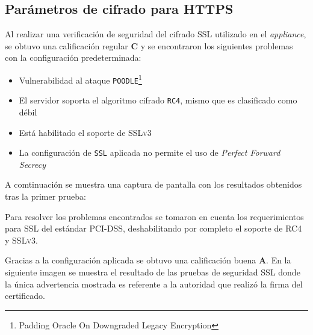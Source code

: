       \subsection {Par\'{a}metros de cifrado para \textsc{HTTPS}}

Al realizar una verificaci\'{o}n de seguridad del cifrado \textsc{SSL} utilizado en el \textsl{appliance}, se obtuvo una calificaci\'{o}n regular \textbf{C} y se encontraron los siguientes problemas con la configuraci\'{o}n predeterminada:

\begin{itemize}
  \item Vulnerabilidad al ataque \texttt{POODLE}\footnote{Padding Oracle On Downgraded Legacy Encryption} \cite{_ssl_????-1} \cite{_ssl-poodle.pdf_????} \cite{_this_????} \cite{barnes_poodle_????} \cite{_security_????-1}

  \item El servidor soporta el algoritmo cifrado \texttt{RC4}, mismo que es clasificado como d\'{e}bil \cite{_security_????}

  \item Est\'{a} habilitado el soporte de \textsc{SSLv3}

  \item La configuraci\'{o}n de \texttt{SSL} aplicada no permite el uso de \textsl{Perfect Forward Secrecy} \cite{_forward_2016}
\end{itemize}

A comtinuaci\'{o}n se muestra una captura de pantalla con los resultados obtenidos tras la primer prueba:


Para resolver los problemas encontrados se tomaron en cuenta los requerimientos para \textsc{SSL} del est\'{a}ndar \textsc{PCI-DSS}, deshabilitando por completo el soporte de \textsc{RC4} y \textsc{SSLv3}.

Gracias a la configuraci\'{o}n aplicada se obtuvo una calificaci\'{o}n buena \textbf{A}. En la siguiente imagen se muestra el resultado de las pruebas de seguridad SSL donde la \'{u}nica advertencia mostrada es referente a la autoridad que realiz\'{o} la firma del certificado. \cite{_ssl_????}


